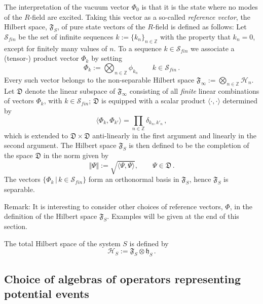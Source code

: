 \documentclass[12pt]{article}
\begin{document}
\begin{enumerate}
{The interpretation of the vacuum vector $\Phi_{{0}}$ is that it is the state where no modes of the $R$-field 
are excited. Taking this vector as a so-called \textit{reference vector}, the Hilbert space, $\mathfrak{F}_{S}$, 
of pure state vectors of the $R$-field is defined as follows: 
Let $\mathcal{S}_{fin}$ be the set of infinite sequences 
${k}:= \big\{k_n\big\}_{n\in \mathbb{Z}}$ with the property that $k_n =0$, except for finitely many values 
of $n$. To a sequence ${k}\in \mathcal{S}_{fin}$ we associate a (tensor-) product vector $\Phi_{{k}}$ by setting
\begin{equation}\label{CONS}
\Phi_{{k}}:= \bigotimes_{n\in \mathbb{Z}} \phi_{k_n}\qquad {k} \in \mathcal{S}_{fin}\,.
\end{equation}
Every such vector belongs to the non-separable Hilbert space 
$\mathfrak{F}_{\infty}:=\bigotimes_{n\in \mathbb{Z}} \mathcal{H}_n$. Let 
$\mathfrak{D}$ denote the linear subspace of $\mathfrak{F}_{\infty}$ consisting of all \textit{finite} linear combinations of 
vectors $\Phi_{{k}}$, with ${k}\in \mathcal{S}_{fin}$; $\mathfrak{D}$ is equipped with a scalar product 
$\langle \cdot, \cdot \rangle$ determined by
\begin{equation}\label{scalar prod}
\langle \Phi_{{k}}, \Phi_{{k}'}\rangle = \prod_{n \in \mathbb{Z}} \delta_{k_n, k'_n}\,,
\end{equation}
which is extended to $\mathfrak{D}\times \mathfrak{D}$ anti-linearly in the first argument and linearly in the second argument. 
The Hilbert space $\mathfrak{F}_{S}$ is then defined to be the completion of the space $\mathfrak{D}$ in the norm given by 
$$\Vert \Psi \Vert:= \sqrt{\langle \Psi, \Psi \rangle}, \qquad \Psi \in \mathfrak{D}\,.$$
The vectors $\big\{\Phi_{{k}}\,\vert\, {k}\in \mathcal{S}_{fin}\big\}$ form an orthonormal basis in 
$\mathfrak{F}_S$, hence $\mathfrak{F}_S$ is separable.

{Remark}: It is interesting to consider other choices of reference vectors, $\Phi$, in the definition of the Hilbert space 
$\mathfrak{F}_S$. Examples will be given at the end of this section.

The total Hilbert space of the system $S$ is defined by
\begin{equation}
\mathcal{H}_S:= \mathfrak{F}_{S}\otimes \mathfrak{h}_S\,.
\end{equation}
}
\end{enumerate}

\subsection{Choice of algebras of operators representing potential events}
\end{document}
